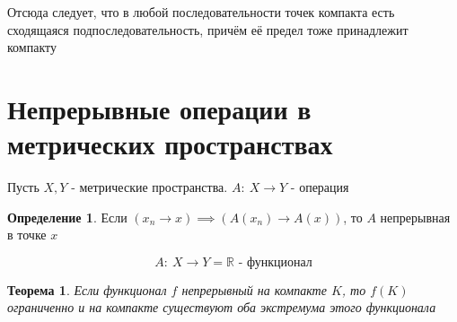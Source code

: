 \documentclass[a4paper]{article}
\newtheorem*{theorem}{Теорема}
\theoremstyle{definition}
\newtheorem*{definition}{Определение}
\theoremstyle{remark}
\begin{document}
Отсюда следует, что в любой последовательности точек компакта есть сходящаяся
подпоследовательность, причём её предел тоже принадлежит компакту

\section*{\centering Непрерывные операции в метрических пространствах}

Пусть $ X,Y $ - метрические пространства. $ A: \ X \to Y $ - операция 

\begin{tcolorbox}
    \begin{definition}
        Если $ (x_n \to x) \implies (A(x_n) \to A(x)) $, то $ A $ непрерывная в точке $ x $ 
    \end{definition}
\end{tcolorbox}

\begin{tcolorbox}
    \[
        A: \ X \to Y = \mathbb{R} \text{ - функционал}
    \]
\end{tcolorbox}

\begin{tcolorbox}
    \begin{theorem}
        Если функционал $ f $ непрерывный на компакте $ K $, то $ f(K) $ ограниченно
        и на компакте существуют оба экстремума этого функционала
    \end{theorem}
\end{tcolorbox}
\end{document}

